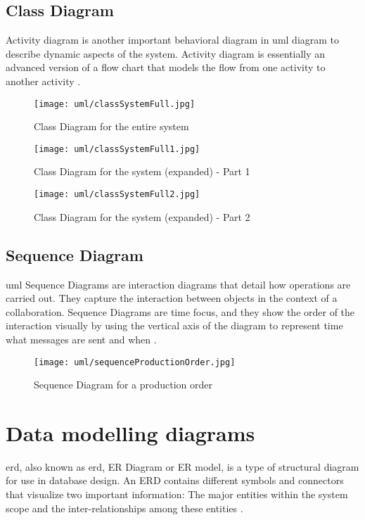 \documentclass[12pt]{report}
\begin{document}
\newpage
\subsection{Class Diagram}
Activity diagram is another important behavioral diagram in \acrshort{uml} diagram to describe dynamic aspects of the system. Activity diagram is essentially an advanced version of a flow chart that models the flow from one activity to another activity \cite{vparadigm_2018_uml}.

\begin{figure}[H]
	\centering
	\texttt{[image: uml/classSystemFull.jpg]}
	\caption{Class Diagram for the entire system}
\end{figure}

\begin{figure}[H]
	\centering
	\texttt{[image: uml/classSystemFull1.jpg]}
	\caption{Class Diagram for the system (expanded) - Part 1}
\end{figure}

\begin{figure}[H]
	\centering
	\texttt{[image: uml/classSystemFull2.jpg]}
	\caption{Class Diagram for the system (expanded) - Part 2}
\end{figure}

\newpage
\subsection{Sequence Diagram}
\acrshort{uml} Sequence Diagrams are interaction diagrams that detail how operations are carried out. They capture the interaction between objects in the context of a collaboration. Sequence Diagrams are time focus, and they show the order of the interaction visually by using the vertical axis of the diagram to represent time what messages are sent and when \cite{vparadigm_2018_uml}.

\begin{figure}[H]
	\centering
	\texttt{[image: uml/sequenceProductionOrder.jpg]}
	\caption{Sequence Diagram for a production order}
\end{figure}

\section{Data modelling diagrams}
\acrlong{erd}, also known as \acrshort{erd}, ER Diagram or ER model, is a type of structural diagram for use in database design. An ERD contains different symbols and connectors that visualize two important information: The major entities within the system scope and the inter-relationships among these entities \cite{vparadigm_2018_uml}.
\end{document}
